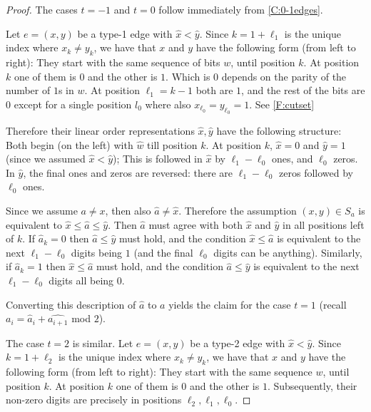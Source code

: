\documentclass[12pt]{article}
\theoremstyle{definition}
\numberwithin{equation}{section}
\renewcommand{\hat}{\widehat}
\begin{document}
\begin{proof}
  The cases $t=-1$ and $t=0$ follow immediately from \cref{C:0-1edges}.

  Let $e=(x,y)$ be a type-1 edge with $\hat{x}<\hat{y}$.
  Since $k=1+\ell_1$ is the unique index where $x_k\neq y_k$, we have that $x$ and $y$ have the following form (from left to right):
  They start with the same sequence of bits $w$, until position $k$.
  At position $k$ one of them is $0$ and the other is $1$.
  Which is $0$ depends on the parity of the number of $1$s in $w$.
  At position $\ell_1 = k-1$ both are $1$, and the rest of the bits are $0$ except for a single position $l_0$ where
  also $x_{\ell_0}=y_{\ell_0}=1$.
  See \cref{F:cutset}

  Therefore their linear order representations $\hat{x},\hat{y}$ have the following structure:
  Both begin (on the left) with $\hat{w}$ till position $k$.
  At position $k$, $\hat{x}=0$ and $\hat{y}=1$ (since we assumed $\hat{x}<\hat{y}$);
  This is followed in $\hat{x}$ by $\ell_1-\ell_0$ ones, and $\ell_0$ zeros.
  In $\hat{y}$, the final ones and zeros are reversed: there are $\ell_1-\ell_0$ zeros followed by $\ell_0$ ones.

  Since we assume $a \neq x$, then also $\hat a \neq \hat x$.
  Therefore the assumption $(x,y)\in S_a$ is equivalent to $\hat{x} \leq \hat{a} \leq \hat{y}$.
  Then $\hat{a}$ must agree with both $\hat{x}$ and $\hat{y}$ in all positions left of $k$.
  If $\hat{a}_k=0$ then $\hat{a} \leq \hat{y}$ must hold, and the condition $\hat{x} \leq \hat{a}$ is equivalent to the next $\ell_1-\ell_0$ digits being $1$ (and the final $\ell_0$ digits can be anything).
  Similarly, if $\hat{a}_k=1$ then $\hat{x} \leq \hat{a}$ must hold, and the condition $\hat{a} \leq \hat{y}$ is equivalent to the next $\ell_1-\ell_0$ digits all being $0$.

  Converting this description of $\hat{a}$ to $a$ yields the claim for the case $t=1$ (recall $a_i=\hat{a}_i+\hat{a_{i+1}}$ mod $2$).

  \medskip

  The case $t=2$ is similar.
  Let $e=(x,y)$ be a type-2 edge with $\hat{x}<\hat{y}$.
  Since $k=1+\ell_2$ is the unique index where $x_k\neq y_k$, we have that $x$ and $y$ have the following form (from left to right):
  They start with the same sequence $w$, until position $k$.
  At position $k$ one of them is $0$ and the other is $1$.
  Subsequently, their non-zero digits are precisely in positions $\ell_2,\ell_1,\ell_0$.


\end{proof}
\end{document}
